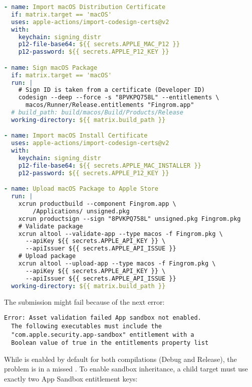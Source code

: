 \begin{lstlisting}[language=yaml]
- name: Import macOS Distribution Certificate
  if: matrix.target == 'macOS'
  uses: apple-actions/import-codesign-certs@v2
  with: 
    keychain: signing_distr
    p12-file-base64: ${{ secrets.APPLE_MAC_P12 }}
    p12-password: ${{ secrets.APPLE_P12_KEY }}

- name: Sign macOS Package
  if: matrix.target == 'macOS'
  run: |
    # Sign ID is taken from a certificate (Developer ID)
    codesign --deep --force -s "8PVKPQ758L" --entitlements \
      macos/Runner/Release.entitlements "Fingrom.app"
  # build_path: build/macos/Build/Products/Release
  working-directory: ${{ matrix.build_path }}

- name: Import macOS Install Certificate
  uses: apple-actions/import-codesign-certs@v2
  with: 
    keychain: signing_distr
    p12-file-base64: ${{ secrets.APPLE_MAC_INSTALLER }}
    p12-password: ${{ secrets.APPLE_P12_KEY }}

- name: Upload macOS Package to Apple Store
  run: |
    xcrun productbuild --component Fingrom.app \
        /Applications/ unsigned.pkg
    xcrun productsign --sign "8PVKPQ758L" unsigned.pkg Fingrom.pkg
    # Validate package
    xcrun altool --validate-app --type macos -f Fingrom.pkg \
      --apiKey ${{ secrets.APPLE_API_KEY }} \
      --apiIssuer ${{ secrets.APPLE_API_ISSUE }}
    # Upload package
    xcrun altool --upload-app --type macos -f Fingrom.pkg \
      --apiKey ${{ secrets.APPLE_API_KEY }} \
      --apiIssuer ${{ secrets.APPLE_API_ISSUE }}
  working-directory: ${{ matrix.build_path }}
\end{lstlisting}


\noindent The submission might fail because of the next error:

\begin{lstlisting}[language=terminal]
Error: Asset validation failed App sandbox not enabled. 
  The following executables must include the 
  "com.apple.security.app-sandbox" entitlement with a 
  Boolean value of true in the entitlements property list
\end{lstlisting}

\noindent While \q{app-sandbox} is enabled by default for both compilations (Debug and Release), the problem is in a 
missed \q{com.apple.security.inherit}. To enable sandbox inheritance, a child target must use exactly two App Sandbox 
entitlement keys:

